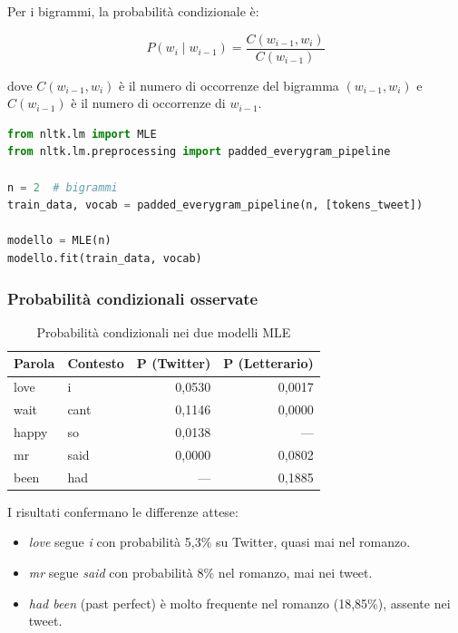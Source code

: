 \documentclass[12pt, a4paper]{article}
\begin{document}
Per i bigrammi, la probabilità condizionale è:

\begin{equation}
P(w_i \mid w_{i-1}) = \frac{C(w_{i-1}, w_i)}{C(w_{i-1})}
\end{equation}

dove $C(w_{i-1}, w_i)$ è il numero di occorrenze del bigramma
$(w_{i-1}, w_i)$ e $C(w_{i-1})$ è il numero di occorrenze
di $w_{i-1}$.

\begin{lstlisting}[language=Python, caption=Addestramento modello MLE]
from nltk.lm import MLE
from nltk.lm.preprocessing import padded_everygram_pipeline

n = 2  # bigrammi
train_data, vocab = padded_everygram_pipeline(n, [tokens_tweet])

modello = MLE(n)
modello.fit(train_data, vocab)
\end{lstlisting}

\subsubsection{Probabilità condizionali osservate}

\begin{table}[H]
\centering
\begin{tabular}{llrr}
\toprule
\textbf{Parola} & \textbf{Contesto} &
\textbf{P (Twitter)} & \textbf{P (Letterario)} \\
\midrule
love  & i    & 0,0530 & 0,0017 \\
wait  & cant & 0,1146 & 0,0000 \\
happy & so   & 0,0138 & --- \\
mr    & said & 0,0000 & 0,0802 \\
been  & had  & ---    & 0,1885 \\
\bottomrule
\end{tabular}
\caption{Probabilità condizionali nei due modelli MLE}
\end{table}

I risultati confermano le differenze attese:
\begin{itemize}
    \item \textit{love} segue \textit{i} con probabilità 5,3\% su Twitter,
          quasi mai nel romanzo.
    \item \textit{mr} segue \textit{said} con probabilità 8\% nel romanzo,
          mai nei tweet.
    \item \textit{had been} (past perfect) è molto frequente nel romanzo
          (18,85\%), assente nei tweet.
\end{itemize}
\end{document}
